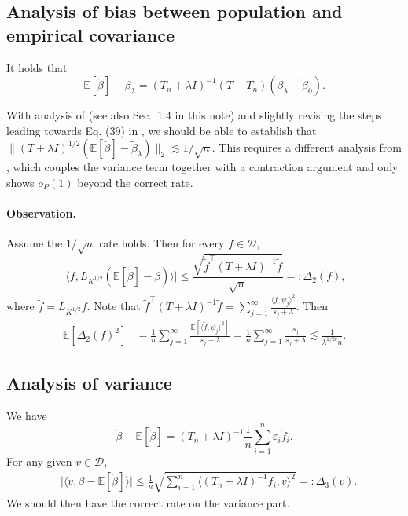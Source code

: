 \documentclass[11pt,a4paper]{article}
\renewcommand{\tilde}{\widetilde}
\theoremstyle{definition}
\theoremstyle{plain}
\theoremstyle{remark}
\newcommand{\mD}{\mathcal D}
\begin{document}
\subsection{Analysis of bias between population and empirical covariance}
It holds that
$$
\mathbb E[\check\beta]-\tilde\beta_\lambda = (T_n+\lambda I)^{-1}(T-T_n)(\tilde\beta_\lambda-\tilde\beta_0).
$$

{\color{red}
With analysis of \cite{caponnetto2007optimal} (see also Sec.~1.4 in this note) and slightly revising the steps leading towards Eq. (39) in \cite{caponnetto2007optimal}, we should be able to establish that $\|(T+\lambda I)^{1/2}(\mathbb E[\check\beta]-\tilde\beta_\lambda)\|_2\lesssim 1/\sqrt{n}$.
This requires a different analysis from \cite{cai2012minimax}, which couples the variance term together with a contraction argument and only shows $o_P(1)$ beyond the correct rate.
}

\paragraph{Observation.} Assume the $1/\sqrt{n}$ rate holds. Then for every $f\in\mD$, 
$$
\big|\langle f, L_{K^{1/2}}(\mathbb E[\check\beta]-\tilde\beta)\rangle\big| \leq \frac{\sqrt{\tilde f^\top (T+\lambda I)^{-1} \tilde f}}{\sqrt{n}} =: \Delta_2(f),
$$
where $\tilde f = L_{K^{1/2}}f$. Note that $\tilde f^\top (T+\lambda I)^{-1}\tilde f = \sum_{j=1}^{\infty} \frac{\langle\tilde f, \psi_j\rangle^2}{s_j+\lambda}$. Then
\begin{align*}
\mathbb E[\Delta_2(f)^2] &= \frac{1}{n}\sum_{j=1}^{\infty} \frac{\mathbb E[\langle\tilde f,\psi_j\rangle^2]}{s_j+\lambda} = \frac{1}{n}\sum_{j=1}^{\infty} \frac{s_j}{s_j+\lambda} \lesssim \frac{1}{\lambda^{1/2r} n}.
\end{align*}

\subsection{Analysis of variance}
We have
$$
\check\beta - \mathbb E[\check\beta] = (T_n+\lambda I)^{-1}\frac{1}{n}\sum_{i=1}^n\varepsilon_i \tilde f_i.
$$
For any given $v\in\mathcal D$, 
\begin{align*}
&\big|\langle v,\check\beta-\mathbb E[\check\beta]\rangle\big| \leq \frac{1}{n}\sqrt{\sum_{i=1}^n \langle(T_n+\lambda I)^{-1}\tilde f_i,v\rangle^2}=:\Delta_3(v).
\end{align*}
We should then have the correct rate on the variance part.
\end{document}
